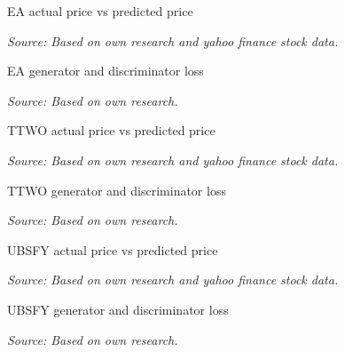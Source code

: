 \documentclass[11pt]{article} %
\begin{document}
\begin{figure}[H]
\caption{EA actual price vs predicted price}
\begin{adjustbox}{width=1.3\textwidth,center}

\end{adjustbox}
\caption*{\textit{Source: Based on own research and yahoo finance stock data.}}
\end{figure}

\begin{figure}[H]
\caption{EA generator and discriminator loss}
\begin{adjustbox}{width=1.3\textwidth,center}

\end{adjustbox}
\caption*{\textit{Source: Based on own research.}}
\end{figure}

\begin{figure}[H]
\caption{TTWO actual price vs predicted price}
\begin{adjustbox}{width=1.3\textwidth,center}

\end{adjustbox}
\caption*{\textit{Source: Based on own research and yahoo finance stock data.}}
\end{figure}

\begin{figure}[H]
\caption{TTWO generator and discriminator loss}
\begin{adjustbox}{width=1.3\textwidth,center}

\end{adjustbox}
\caption*{\textit{Source: Based on own research.}}
\end{figure}

\begin{figure}[H]
\caption{UBSFY actual price vs predicted price}
\begin{adjustbox}{width=1.3\textwidth,center}

\end{adjustbox}
\caption*{\textit{Source: Based on own research and yahoo finance stock data.}}
\end{figure}

\begin{figure}[H]
\caption{UBSFY generator and discriminator loss}
\begin{adjustbox}{width=1.3\textwidth,center}

\end{adjustbox}
\caption*{\textit{Source: Based on own research.}}
\end{figure}
\end{document}
